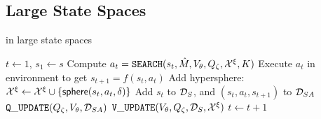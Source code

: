 \subsection{Large State Spaces}
\label{sec:large-state-spaces}

\begin{algorithm}[t]
	\caption{\cmaxpp{} in large state spaces}
	\begin{algorithmic}[1]
		\State $t \leftarrow 1$, $s_1 \leftarrow s$
			\State Compute $a_t = \mathtt{SEARCH}(s_t, \hat{M}, V_\theta, Q_\zeta, \mathcal{X}^\xi, K)$
			\State Execute $a_t$ in environment to get $s_{t+1} = f(s_t, a_t)$
				\State Add hypersphere: $\mathcal{X}^\xi \leftarrow \mathcal{X}^\xi \cup \{\mathsf{sphere}(s_t, a_t, \delta)\}$\label{line:hypersphere}
			\EndIf
			\State Add $s_t$ to $\mathcal{D}_S$, and $(s_t, a_t, s_{t+1})$ to $\mathcal{D}_{SA}$
			\label{line:approximation_updates}
			\State $\mathtt{Q\_UPDATE}(Q_\zeta, V_\theta, \mathcal{D}_{SA})$
			\State $\mathtt{V\_UPDATE}(V_\theta, Q_\zeta, \mathcal{D}_S, \mathcal{X}^\xi)$
			\EndFor
			\State $t \leftarrow t + 1$
		\EndWhile
		\EndFor

\end{algorithmic}
\end{algorithm}

